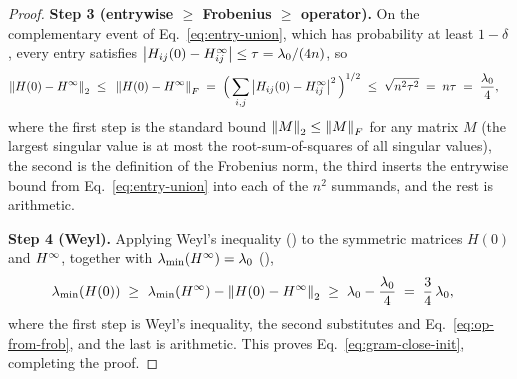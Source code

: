 \begin{proof}
\smallskip\noindent\textbf{Step 3 (entrywise $\ge$ Frobenius $\ge$ operator).}
On the complementary event of Eq.~\eqref{eq:entry-union}, which has probability at least
$1 - \delta$, every entry satisfies $\left| H_{ij}(0) - H^{\infty}_{ij} \right| \le \tau = \lambda_{0}/(4n)$, so
\begin{align}\label{eq:op-from-frob}
\left\| H(0) - H^{\infty} \right\|_{2}
\;\le\; & ~ \left\| H(0) - H^{\infty} \right\|_{F}
\;=\; \Big( \sum_{i,j} \left| H_{ij}(0) - H^{\infty}_{ij} \right|^2 \Big)^{1/2}
\;\le\; \sqrt{n^2 \tau^2}
\;=\; n\tau
\;=\; \frac{\lambda_{0}}{4},
\end{align}
where the first step is the standard bound $\left\| M \right\|_{2} \le \left\| M \right\|_{F}$ for any matrix $M$ (the
largest singular value is at most the root-sum-of-squares of all singular values), the second
is the definition of the Frobenius norm, the third inserts the entrywise bound from
Eq.~\eqref{eq:entry-union} into each of the $n^2$ summands, and the rest is arithmetic.

\smallskip\noindent\textbf{Step 4 (Weyl).}
Applying Weyl's inequality () to the symmetric matrices $H(0)$ and $H^{\infty}$,
together with $\lambda_{\min}(H^{\infty}) = \lambda_{0}$ (),
\begin{align}\label{eq:weyl-init}
\lambda_{\min}\!\left( H(0) \right)
\;\ge\; & ~ \lambda_{\min}\!\left( H^{\infty} \right) - \left\| H(0) - H^{\infty} \right\|_{2}
\;\ge\; \lambda_{0} - \frac{\lambda_{0}}{4}
\;=\; \frac{3}{4}\,\lambda_{0},
\end{align}
where the first step is Weyl's inequality, the second substitutes  and
Eq.~\eqref{eq:op-from-frob}, and the last is arithmetic. This proves
Eq.~\eqref{eq:gram-close-init}, completing the proof.
\end{proof}

